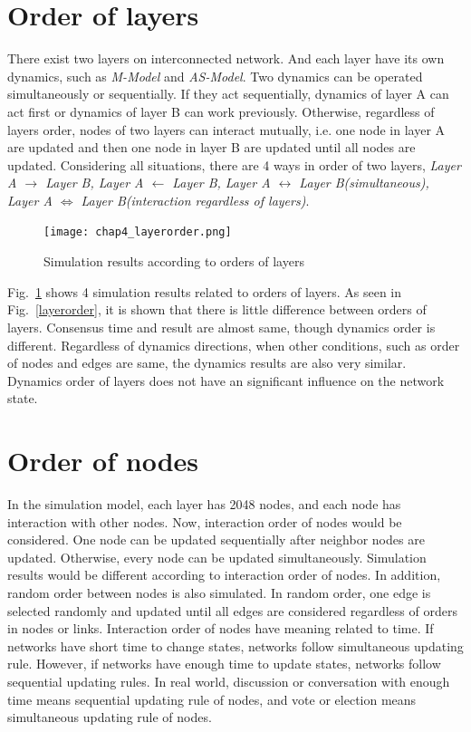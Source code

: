 \section{Order of layers}
There exist two layers on interconnected network. And each layer have its own dynamics, such as \textit{M-Model} and \textit{AS-Model}. Two dynamics can be operated simultaneously or sequentially. If they act sequentially, dynamics of layer A can act first or dynamics of layer B can work previously. Otherwise, regardless of layers order, nodes of two layers can interact mutually, i.e. one node in layer A are updated and then one node in layer B are updated until all nodes are updated.  
Considering all situations, there are 4 ways in order of two layers, \textit{Layer A $\to$ Layer B, Layer A $\leftarrow$ Layer B, Layer A $\leftrightarrow$ Layer B(simultaneous), Layer A $\Leftrightarrow$ Layer B(interaction regardless of layers)}. 
\begin{figure}[!htb]
	\centering
	\texttt{[image: chap4\_layerorder.png]}
	\caption{Simulation results according to orders of layers}
	\label{chap4_layerorder}
\end{figure}
Fig.~\ref{chap4_layerorder} shows 4 simulation results related to orders of layers. As seen in Fig.~\ref{layerorder}, it is shown that there is little difference between orders of layers. Consensus time and result are almost same, though dynamics order is different. Regardless of dynamics directions, when other conditions, such as order of nodes and edges are same, the dynamics results are also very similar. Dynamics order of layers does not have an significant influence on the network state.  

\section{Order of nodes}
In the simulation model, each layer has 2048 nodes, and each node has interaction with other nodes. Now, interaction order of nodes would be considered. One node can be updated sequentially after neighbor nodes are updated. Otherwise, every node can be updated simultaneously. Simulation results would be different according to interaction order of nodes. In addition, random order between nodes is also simulated. In random order, one edge is selected randomly and updated until all edges are considered regardless of orders in nodes or links. Interaction order of nodes have meaning related to time. If networks have short time to change states, networks follow simultaneous updating rule. However, if networks have enough time to update states, networks follow sequential updating rules. In real world, discussion or conversation with enough time means sequential updating rule of nodes, and vote or election means simultaneous updating rule of nodes. 

